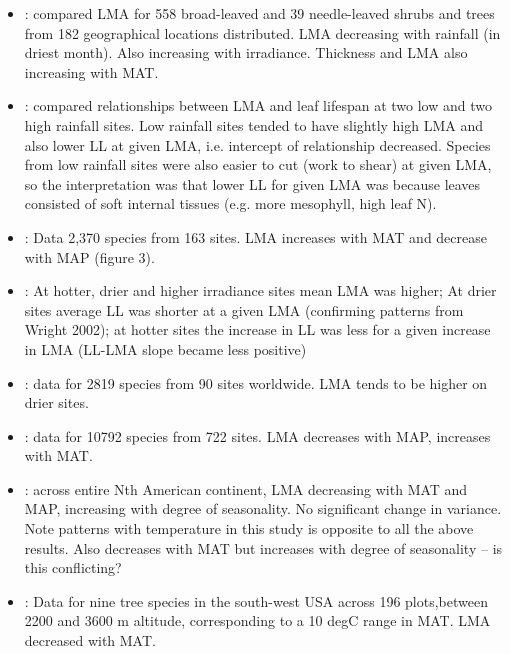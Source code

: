 \documentclass[a4paper,11pt]{article}
\begin{document}
\begin{itemize}
\item \citet{Niinemets-2001}: compared LMA for 558 broad-leaved and 39 needle-leaved shrubs and trees from 182 geographical locations distributed. LMA decreasing with rainfall (in driest month). Also increasing with irradiance. Thickness and LMA also increasing with MAT.

\item \citet{Wright-2002}: compared relationships between LMA and leaf lifespan at two low and two high rainfall sites. Low rainfall sites tended to have slightly high LMA and also lower LL at given LMA, i.e. intercept of relationship decreased. Species from low rainfall sites were also easier to cut (work to shear) at given LMA, so the interpretation was that lower LL for given LMA was because leaves consisted of soft internal tissues (e.g. more mesophyll, high leaf N).

\item \citet{Wright-2004}: Data 2,370 species from 163 sites. LMA increases with MAT and decrease with MAP (figure 3).

\item \citet{Wright-2005}: At hotter, drier and higher irradiance sites mean LMA was higher; At drier sites average LL was shorter at a given LMA (confirming patterns from Wright 2002); at hotter sites the increase in LL was less for a given increase in LMA (LL-LMA slope became less positive)

\item \citet{Onoda-2011}: data for 2819 species from 90 sites worldwide. LMA tends to be higher on drier sites.

\item \citet{Moles-2014}: data for 10792 species from 722 sites. LMA decreases with MAP, increases with MAT.

\item \citet{Simova-2015}: across entire Nth American continent, LMA decreasing with MAT and MAP, increasing with degree of seasonality. No significant change in variance. Note patterns with temperature in this study is opposite to all the above results. Also decreases with MAT but increases with degree of seasonality -- is this conflicting?

\item \citet{Laughlin-2012}: Data for nine tree species in the south-west USA across 196 plots,between 2200 and 3600 m altitude, corresponding to a 10 degC range in MAT. LMA decreased with MAT.


\end{itemize}
\end{document}
